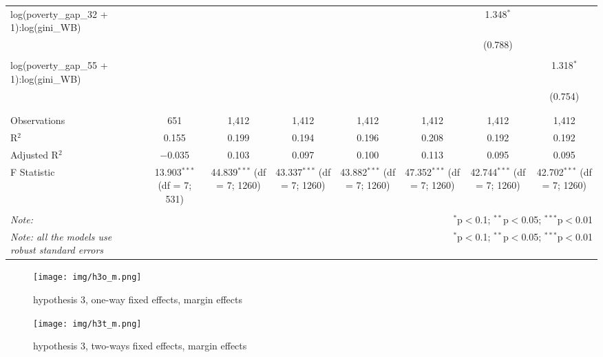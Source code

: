 \documentclass[a4paper, 12pt]{article}
\begin{document}
\begin{table}[!htbp]
{\begin{tabular}{@{\extracolsep{5pt}}lccccccc}
 log(poverty\_gap\_32 + 1):log(gini\_WB) &  &  &  &  &  & 1.348$^{*}$ &  \\ 
  &  &  &  &  &  & (0.788) &  \\ 
  & & & & & & & \\ 
 log(poverty\_gap\_55 + 1):log(gini\_WB) &  &  &  &  &  &  & 1.318$^{*}$ \\ 
  &  &  &  &  &  &  & (0.754) \\ 
  & & & & & & & \\ 
\hline \\[-1.8ex] 
Observations & 651 & 1,412 & 1,412 & 1,412 & 1,412 & 1,412 & 1,412 \\ 
R$^{2}$ & 0.155 & 0.199 & 0.194 & 0.196 & 0.208 & 0.192 & 0.192 \\ 
Adjusted R$^{2}$ & $-$0.035 & 0.103 & 0.097 & 0.100 & 0.113 & 0.095 & 0.095 \\ 
F Statistic & 13.903$^{***}$ (df = 7; 531) & 44.839$^{***}$ (df = 7; 1260) & 43.337$^{***}$ (df = 7; 1260) & 43.882$^{***}$ (df = 7; 1260) & 47.352$^{***}$ (df = 7; 1260) & 42.744$^{***}$ (df = 7; 1260) & 42.702$^{***}$ (df = 7; 1260) \\ 
\hline 
\hline \\[-1.8ex] 
\textit{Note:}  & \multicolumn{7}{r}{$^{*}$p$<$0.1; $^{**}$p$<$0.05; $^{***}$p$<$0.01} \\ 
\textit{Note: all the models use robust standard errors}  & \multicolumn{7}{r}{$^{*}$p$<$0.1; $^{**}$p$<$0.05; $^{***}$p$<$0.01} \\ 
\end{tabular} 
}
\end{table} 

\begin{figure}[h!]
    \centering
    \texttt{[image: img/h3o\_m.png]}
    \caption{hypothesis 3, one-way fixed effects, margin effects}
    \label{h3o_m}
\end{figure}

\begin{figure}[h!]
    \centering
    \texttt{[image: img/h3t\_m.png]}
    \caption{hypothesis 3, two-ways fixed effects, margin effects}
    \label{h3t_m}
\end{figure}
\end{document}
